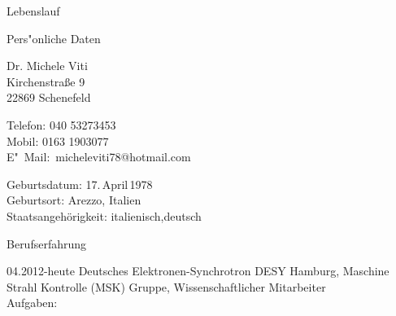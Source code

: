 \documentclass[11pt,a4paper]{scrartcl}
\begin{document}
\begin{cv}{Lebenslauf}
\begin{cvlist}{Pers"onliche Daten}
\item Dr. Michele Viti\\
Kirchenstra{\ss}e 9\\
22869 Schenefeld
\item Telefon: 040 53273453\\
Mobil: 0163 1903077\\
E"~Mail:~micheleviti78@hotmail.com
\item Geburtsdatum: 17.\,April\,1978\\
Geburtsort: Arezzo, Italien\\
Staatsangeh\"origkeit: italienisch,deutsch
\end{cvlist}

\begin{cvlist}{Berufserfahrung}

\item[04.2012-heute] Deutsches Elektronen-Synchrotron DESY Hamburg,
Maschine Strahl Kontrolle (MSK) Gruppe, Wissenschaftlicher Mitarbeiter\\

Aufgaben:\\


\end{cvlist}
\end{cv}
\end{document}

